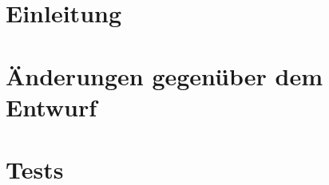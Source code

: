 

	\maketitle
	\setcounter{tocdepth}{1}
	\tableofcontents

	\chapter{Einleitung}
			
	\chapter{Änderungen gegenüber dem Entwurf}
	\label{chap:entwurf}
		
	\chapter{Tests}
	\label{chap:test}
		

